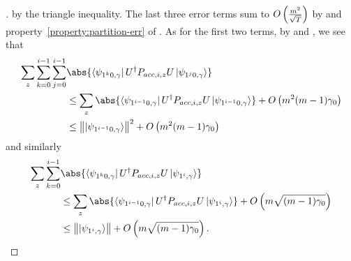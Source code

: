 \begin{proof}[]
	by the triangle inequality.
	The last three error terms sum to $O\left(\frac{m^2}{\sqrt{T}}\right)$ by  and property~\ref{property:partition-err} of .
	As for the first two terms, by  and , we see that
	\begin{align*}
		\sum_z \sum_{k=0}^{i-1}\sum_{j=0}^{i-1}
		&\abs{\bra{\psi_{1^k0,\gamma}}U^\dag  P_{acc,i,z}U \ket{\psi_{1^j0,\gamma}}} \\
		&\leq\sum_z \abs{\bra{\psi_{1^{i-1}0,\gamma}}U^\dag  P_{acc,i,z}U \ket{\psi_{1^{i-1}0,\gamma}}} + O\L(m^2(m-1)\gamma_0\R) \\
		&\leq\norm{\ket{\psi_{1^{i-1}0,\gamma}}}^2 + O\L(m^2(m-1)\gamma_0\R)
	\end{align*}
	and similarly
	\begin{align*}
		\sum_z\sum_{k=0}^{i-1}
		&\abs{\bra{\psi_{1^k0,\gamma}}U^\dag  P_{acc,i,z}U \ket{\psi_{1^i,\gamma}}}\\
		&\leq\sum_z\abs{\bra{\psi_{1^{i-1}0,\gamma}}U^\dag  P_{acc,i,z}U \ket{\psi_{1^i,\gamma}}}+O\L(m\sqrt{(m-1)\gamma_0}\R)\\
		&\leq\norm{\ket{\psi_{1^i,\gamma}}}+O\L(m\sqrt{(m-1)\gamma_0}\R).
	\end{align*}
\end{proof}





